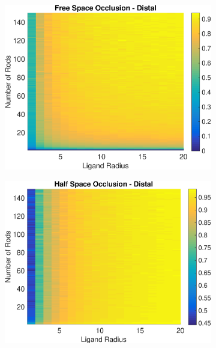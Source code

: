 \documentclass[../../AdvancementSummary.tex]{subfiles}
\begin{document}
\begin{figure}[H]
\begin{center}
\begin{subfigure}{0.4\linewidth}
\includegraphics[width=\linewidth]{ResultsFigures/General/OcclusionVSNVSRFree.eps}
\caption{}
\end{subfigure}
\begin{subfigure}{0.4\linewidth}
\includegraphics[width=\linewidth]{ResultsFigures/General/OcclusionVSNVSRHalf.eps}
\caption{}
\end{subfigure}
\begin{subfigure}{0.4\linewidth}

\end{subfigure}
\end{center}
\end{figure}
\end{document}
